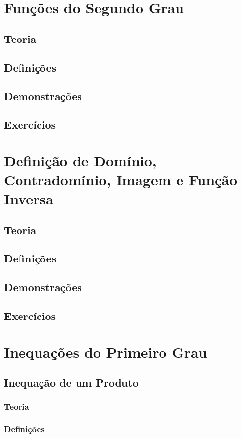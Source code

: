 \documentclass[portuguese, 12pt, a4paper]{article}
\begin{document}
	\section{Funções do Segundo Grau}
	\subsection{Teoria}
	\subsection{Definições}
	\subsection{Demonstrações}
	\subsection{Exercícios}
	
	\section{Definição de Domínio, Contradomínio, Imagem e Função Inversa}
	\subsection{Teoria}
	\subsection{Definições}
	\subsection{Demonstrações}
	\subsection{Exercícios}
	
	\section{Inequações do Primeiro Grau}
	\subsection{Inequação de um Produto}
	\subsubsection*{Teoria}
	\subsubsection*{Definições}
\end{document}
